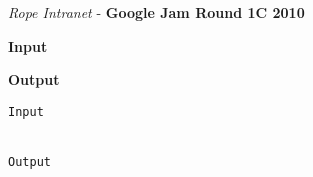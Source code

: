 \begin{problem}{\textit{Rope Intranet} - \textbf{Google Jam Round 1C 2010}}




\textbf{Input}


\textbf{Output}


\begin{framed}
	\begin{verbatim}
Input 


Output 

	\end{verbatim}
\end{framed}

\end{problem}

\begin{solution}
	
	\begin{lstlisting}[language=c++, caption="Store credit c++ solution"]


	\end{lstlisting}
\end{solution}